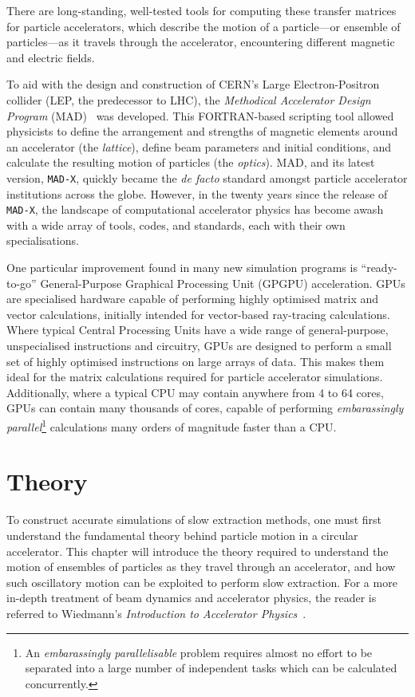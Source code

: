 \documentclass[11pt]{report}
\begin{document}
There are long-standing, well-tested tools for computing these transfer matrices for particle accelerators, which describe the motion of a particle---or ensemble of particles---as it travels through the accelerator, encountering different magnetic and electric fields.

To aid with the design and construction of CERN's Large Electron-Positron collider (LEP, the predecessor to LHC), the \textit{Methodical Accelerator Design Program} (MAD)~\cite{Iselin:MAD} was developed. This FORTRAN-based scripting tool allowed physicists to define the arrangement and strengths of magnetic elements around an accelerator (the \textit{lattice}), define beam parameters and initial conditions, and calculate the resulting motion of particles (the \textit{optics}). MAD, and its latest version, \verb|MAD-X|, quickly became the \textit{de facto} standard amongst particle accelerator institutions across the globe. However, in the twenty years since the release of \verb|MAD-X|, the landscape of computational accelerator physics has become awash with a wide array of tools, codes, and standards, each with their own specialisations. 

One particular improvement found in many new simulation programs is ``ready-to-go'' General-Purpose Graphical Processing Unit (GPGPU) acceleration. GPUs are specialised hardware capable of performing highly optimised matrix and vector calculations, initially intended for vector-based ray-tracing calculations. Where typical Central Processing Units have a wide range of general-purpose, unspecialised instructions and circuitry, GPUs are designed to perform a small set of highly optimised instructions on large arrays of data. This makes them ideal for the matrix calculations required for particle accelerator simulations. Additionally, where a typical CPU may contain anywhere from 4 to 64 cores, GPUs can contain many thousands of cores, capable of performing \textit{embarassingly parallel}\footnote{An \textit{embarassingly parallelisable} problem requires almost no effort to be separated into a large number of independent tasks which can be calculated concurrently.} calculations many orders of magnitude faster than a CPU.

\chapter{Theory}\label{chap:theory}

To construct accurate simulations of slow extraction methods, one must first understand the fundamental theory behind particle motion in a circular accelerator. This chapter will introduce the theory required to understand the motion of ensembles of particles as they travel through an accelerator, and how such oscillatory motion can be exploited to perform slow extraction. For a more in-depth treatment of beam dynamics and accelerator physics, the reader is referred to Wiedmann's \textit{Introduction to Accelerator Physics}~\cite{Wiedemann}.
\end{document}
